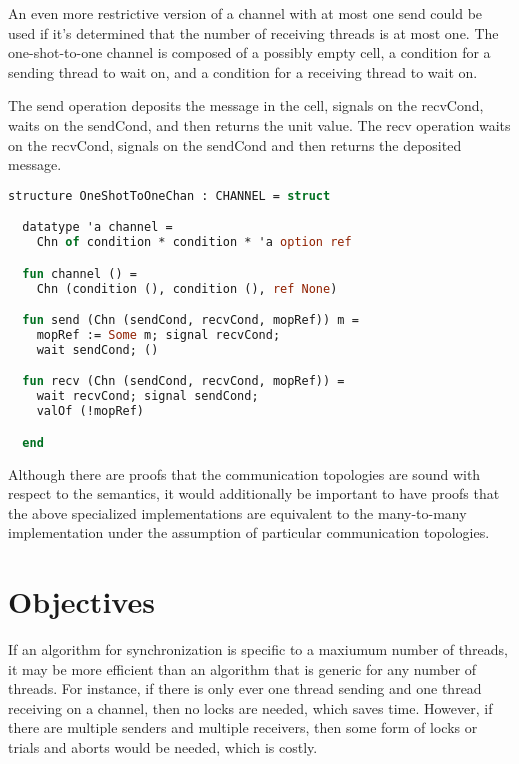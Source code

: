 \documentclass{article}
\begin{document}
An even more restrictive version of a channel with at most one send could be used if it's
determined that the number of receiving threads is at most one.  The one-shot-to-one channel is
composed of a possibly empty cell, a condition for a sending thread to wait on, and a condition
for a receiving thread to wait on.

The send operation deposits the message in the cell, signals on the recvCond, waits on the
sendCond, and then returns the unit value.  The recv operation waits on the recvCond, signals
on the sendCond and then returns the deposited message.


\begin{lstlisting}[language=ML, escapechar=\%]
structure OneShotToOneChan : CHANNEL = struct

  datatype 'a channel =
    Chn of condition * condition * 'a option ref

  fun channel () =
    Chn (condition (), condition (), ref None)

  fun send (Chn (sendCond, recvCond, mopRef)) m =
    mopRef := Some m; signal recvCond;  
    wait sendCond; ()

  fun recv (Chn (sendCond, recvCond, mopRef)) =
    wait recvCond; signal sendCond;
    valOf (!mopRef)

  end
  \end{lstlisting}



Although there are proofs that the communication topologies are sound with respect to the
semantics, it would additionally be important to have proofs that the above specialized
implementations are equivalent to the many-to-many implementation under the assumption of
particular communication topologies.


\section{Objectives}
If an algorithm for synchronization is specific to a maxiumum number of threads, it may be more
efficient than an algorithm that is generic for any number of threads.  For instance, if there
is only ever one thread sending and one thread receiving on a channel, then no locks are
needed, which saves time.  However, if there are multiple senders and multiple receivers, then
some form of locks or trials and aborts would be needed, which is costly.
\end{document}
